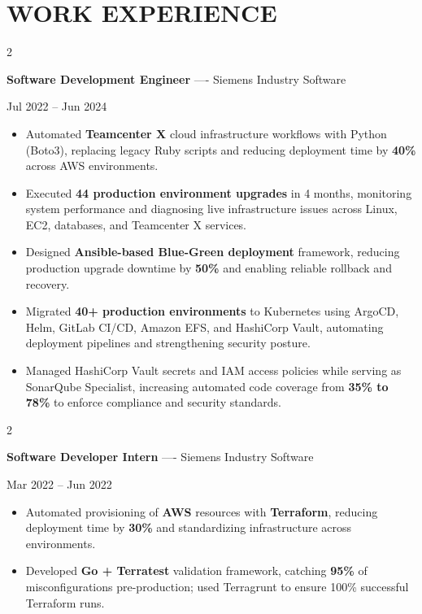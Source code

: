 \documentclass[10pt, letterpaper]{article}
\newenvironment{highlights}{
    \begin{itemize}[
        topsep=0.10 cm,
        parsep=0.06 cm,
        partopsep=0pt,
        itemsep=0.06 cm,
        leftmargin=12pt
    ]
}{
    \end{itemize}
}
\newenvironment{twocolentry}[2][]{
    \onecolentry
    \def\secondColumn{#2}
    \setcolumnwidth{\fill, 4.5 cm}
    \begin{paracol}{2}
}{
    \switchcolumn \raggedleft \secondColumn
    \end{paracol}
    \endonecolentry
}
\begin{document}
\section{WORK EXPERIENCE}
\begin{twocolentry}{Jul 2022 -- Jun 2024}
\textbf{Software Development Engineer} ---- Siemens Industry Software
\end{twocolentry}
\begin{highlights}
  \item Automated \textbf{Teamcenter X} cloud infrastructure workflows with Python (Boto3), replacing legacy Ruby scripts and reducing deployment time by \textbf{40\%} across AWS environments.
  \item Executed \textbf{44 production environment upgrades} in 4 months, monitoring system performance and diagnosing live infrastructure issues across Linux, EC2, databases, and Teamcenter X services.
  \item Designed \textbf{Ansible-based Blue-Green deployment} framework, reducing production upgrade downtime by \textbf{50\%} and enabling reliable rollback and recovery.
  \item Migrated \textbf{40+ production environments} to Kubernetes using ArgoCD, Helm, GitLab CI/CD, Amazon EFS, and HashiCorp Vault, automating deployment pipelines and strengthening security posture.
  \item Managed HashiCorp Vault secrets and IAM access policies while serving as SonarQube Specialist, increasing automated code coverage from \textbf{35\% to 78\%} to enforce compliance and security standards.
\end{highlights}

\vspace{0.15 cm}

\begin{twocolentry}{Mar 2022 -- Jun 2022}
\textbf{Software Developer Intern} ---- Siemens Industry Software
\end{twocolentry}
\begin{highlights}
  \item Automated provisioning of \textbf{AWS} resources with \textbf{Terraform}, reducing deployment time by \textbf{30\%} and standardizing infrastructure across environments.
  \item Developed \textbf{Go + Terratest} validation framework, catching \textbf{95\%} of misconfigurations pre-production; used Terragrunt to ensure 100\% successful Terraform runs.
\end{highlights}
\end{document}
